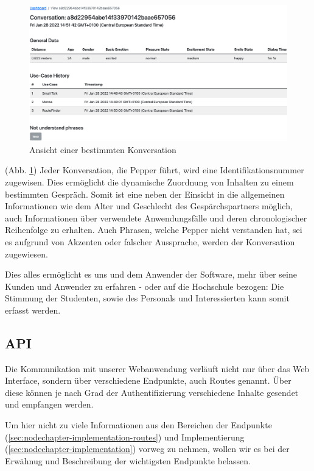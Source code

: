 \begin{figure}[H]
    \includegraphics[width=\textwidth]{Figures/NodeChapter/webappdetail.png}
    \caption{Ansicht einer bestimmten Konversation}
    \label{fig:webappdetail}
    \centering
\end{figure}

(Abb. \ref{fig:webappdetail}) Jeder Konversation, die Pepper führt, wird eine Identifikationsnummer zugewisen. Dies ermöglicht
die dynamische Zuordnung von Inhalten zu einem bestimmten Gespräch. Somit ist eine neben der Einsicht in die allgemeinen Informationen
wie dem Alter und Geschlecht des Gespärchspartners möglich, auch Informationen über verwendete Anwendungsfälle und deren
chronologischer Reihenfolge zu erhalten. Auch Phrasen, welche Pepper nicht verstanden hat, sei es aufgrund von Akzenten oder
falscher Aussprache, werden der Konversation zugewiesen.

Dies alles ermöglicht es uns und dem Anwender der Software, mehr über seine Kunden und Anwender zu erfahren - oder auf die Hochschule
bezogen: Die Stimmung der Studenten, sowie des Personals und Interessierten kann somit erfasst werden.

\subsection{API}
\label{sec:nodechapter-api}
Die Kommunikation mit unserer Webanwendung verläuft nicht nur über das Web Interface, sondern über verschiedene Endpunkte,
auch Routes genannt. Über diese können je nach Grad der Authentifizierung verschiedene Inhalte gesendet und empfangen werden.

Um hier nicht zu viele Informationen aus den Bereichen der Endpunkte (\ref{sec:nodechapter-implementation-routes}) und Implementierung (\ref{sec:nodechapter-implementation}) vorweg zu nehmen,
wollen wir es bei der Erwähnug und Beschreibung der wichtigsten Endpunkte belassen.

